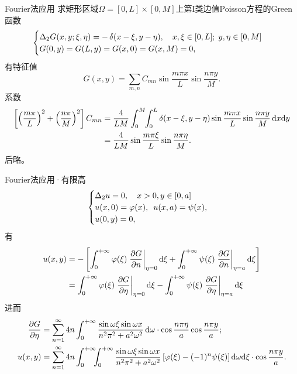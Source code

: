 \begin{example}{Fourier法应用}{}	
	求矩形区域$\Omega=[0,L]\times[0,M]$上第I类边值Poisson方程的Green函数
	\begin{align*}
		\begin{cases}
			\lap_2G(x,y;\xi,\eta)=-\vd(x-\xi,y-\eta),\quad x,\xi\in[0,L];\;y,\eta\in[0,M]\\
			G(0,y)=G(L,y)=G(x,0)=G(x,M)=0,
		\end{cases}
	\end{align*}
	有特征值 
	\[
		G(x,y)=\sum_{m,n}C_{mn}\sin\frac{m\pi x}L\sin\frac{n\pi y}M.
	\]
	系数 
	{\footnotesize
	\begin{align*}
		\fkh{\kh{\frac{m\pi}L}^2+\kh{\frac{n\pi}M}^2}C_{mn}&=\frac4{LM}\int_0^M\bs3\int_0^L\vd(x-\xi,y-\eta)\sin\frac{m\pi x}L\sin\frac{n\pi y}M\d x\nd y\\
		&=\frac4{LM}\sin\frac{m\pi\xi}L\sin\frac{n\pi\eta}M.
	\end{align*}}
	后略。
\end{example}
\begin{example}{Fourier法应用·有限高}{}
	\begin{equation*}
		\begin{cases}
			\lap_2u=0,\quad x>0,y\in[0,a]\\
			u(x,0)=\varphi(x),\enspace u(x,a)=\psi(x),\\
			u(0,y)=0,
		\end{cases}
	\end{equation*}
	有
	\begin{align*}
		u(x,y)&=-\fkh{\int\zti\varphi(\xi)\edg{\pv Gn}_{\eta=0}\d\xi+\int\zti\psi(\xi)\edg{\pv Gn}_{\eta=a}\d\xi}\\
		&=\int\zti\varphi(\xi)\edg{\pv G\eta}_{\eta=0}\d\xi-\int\zti\psi(\xi)\edg{\pv G\eta}_{\eta=a}\d\xi
	\end{align*}
	进而
	{\small
	\begin{align*}
		\pv G\eta&=\sum_{n=1}^\infty4n\int\zti\frac{\sin\omega\xi\sin\omega x}{n^2\pi^2+a^2\omega^2}\d\omega\cdot\cos\frac{n\pi\eta}a\cos\frac{n\pi y}a;\\
		u(x,y)&=\sum_{n=1}^\infty4n\int\zti\bs5\int\zti\frac{\sin\omega\xi\sin\omega x}{n^2\pi^2+a^2\omega^2}\fkh{\varphi(\xi)-(-1)^n\psi(\xi)}\d\omega\nd\xi\cdot\cos\frac{n\pi y}a.
	\end{align*}}
\end{example}
